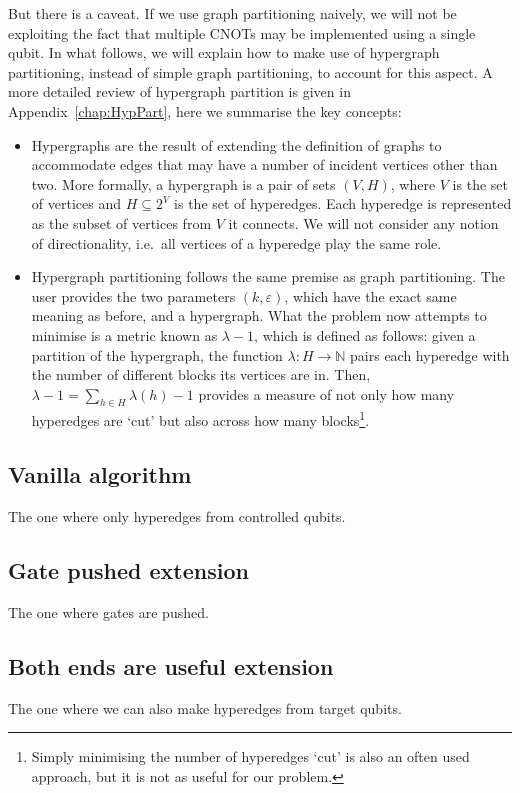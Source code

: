 But there is a caveat. If we use graph partitioning naively, we will not be exploiting the fact that multiple CNOTs may be implemented using a single qubit. In what follows, we will explain how to make use of hypergraph partitioning, instead of simple graph partitioning, to account for this aspect. A more detailed review of hypergraph partition is given in Appendix~\ref{chap:HypPart}, here we summarise the key concepts:

\begin{itemize}
  \item Hypergraphs are the result of extending the definition of graphs to accommodate edges that may have a number of incident vertices other than two. More formally, a hypergraph is a pair of sets \((V,H)\), where \(V\) is the set of vertices and \(H \subseteq 2^V\) is the set of hyperedges. Each hyperedge is represented as the subset of vertices from \(V\) it connects. We will not consider any notion of directionality, i.e.\ all vertices of a hyperedge play the same role.
  \item Hypergraph partitioning follows the same premise as graph partitioning. The user provides the two parameters \((k,\varepsilon)\), which have the exact same meaning as before, and a hypergraph. What the problem now attempts to minimise is a metric known as \(\lambda\!-\!1\), which is defined as follows: given a partition of the hypergraph, the function \(\lambda\colon H \to \mathbb{N}\) pairs each hyperedge with the number of different blocks its vertices are in. Then, \(\lambda\!-\!1 = \sum_{h \in H} \lambda(h) - 1\) provides a measure of not only how many hyperedges are `cut' but also across how many blocks\footnote{Simply minimising the number of hyperedges `cut' is also an often used approach, but it is not as useful for our problem.}.
\end{itemize}

\subsection{Vanilla algorithm}

The one where only hyperedges from controlled qubits.

\subsection{Gate pushed extension}

The one where gates are pushed.

\subsection{Both ends are useful extension}

The one where we can also make hyperedges from target qubits.
